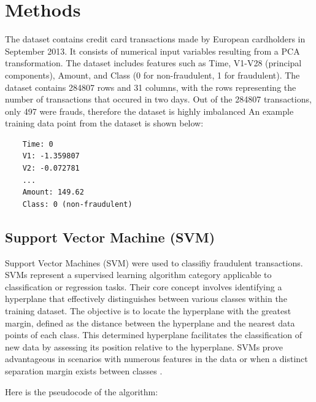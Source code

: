 \documentclass[11pt,article,oneside]{article}
\begin{document}
\section{Methods}

The dataset contains credit card transactions made by European cardholders in September 2013. 
It consists of numerical input variables resulting from a PCA transformation. The dataset \cite{dataset} 
includes features such as Time, V1-V28 (principal components), Amount, and Class (0 for non-fraudulent, 1 for fraudulent). 
The dataset contains 284807 rows and 31 columns, with the rows representing the number of transactions that occured in two days.
Out of the 284807 transactions, only 497 were frauds, therefore the dataset is highly imbalanced
An example training data point from the dataset is shown below:

\begin{verbatim}
    Time: 0
    V1: -1.359807
    V2: -0.072781
    ...
    Amount: 149.62
    Class: 0 (non-fraudulent)
    \end{verbatim}

\subsection{Support Vector Machine (SVM)}
 Support Vector Machines (SVM) were used to classifiy fraudulent transactions. SVMs represent a supervised learning algorithm 
 category applicable to classification or regression tasks. Their core concept involves identifying a hyperplane that effectively distinguishes between various classes within 
 the training dataset. The objective is to locate the hyperplane with the greatest margin, defined as the distance 
 between the hyperplane and the nearest data points of each class. This determined hyperplane facilitates the classification
 of new data by assessing its position relative to the hyperplane. SVMs prove advantageous in scenarios with numerous 
 features in the data or when a distinct separation margin exists between classes \cite{SVMdef}.  


  
  Here is the pseudocode of the algorithm:
\end{document}

